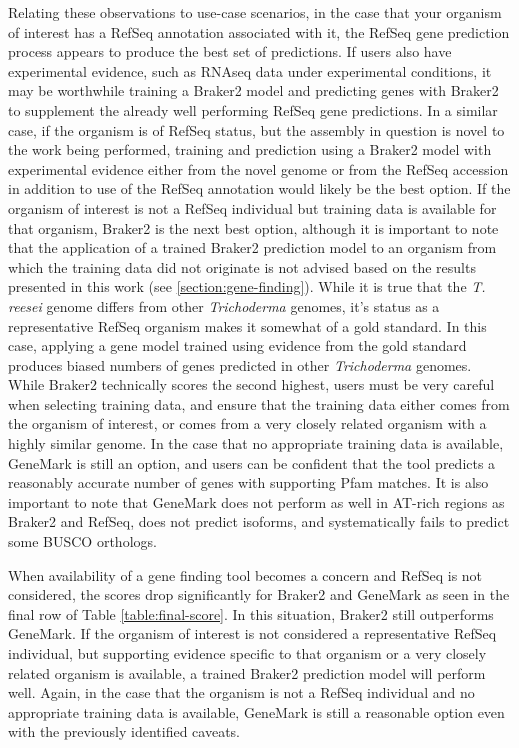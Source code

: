 Relating these observations to use-case scenarios, in the case that
your organism of interest has a RefSeq annotation associated with it,
the RefSeq gene prediction process appears to produce the best set of
predictions. If users also have experimental evidence, such as RNAseq
data under experimental conditions, it may be worthwhile training a
Braker2 model and predicting genes with Braker2 to supplement the
already well performing RefSeq gene predictions. In a similar case, if
the organism is of RefSeq status, but the assembly in question is
novel to the work being performed, training and prediction using a
Braker2 model with experimental evidence either from the novel genome
or from the RefSeq accession in addition to use of the RefSeq
annotation would likely be the best option. If the organism of
interest is not a RefSeq individual but training data is available for
that organism, Braker2 is the next best option, although it is
important to note that the application of a trained Braker2 prediction
model to an organism from which the training data did not originate is
not advised based on the results presented in this work (see
\ref{section:gene-finding}). While it is true that the
\textit{T. reesei} genome differs from other \textit{Trichoderma}
genomes, it's status as a representative RefSeq organism makes it
somewhat of a gold standard. In this case, applying a gene model
trained using evidence from the gold standard produces biased numbers
of genes predicted in other \textit{Trichoderma} genomes. While
Braker2 technically scores the second highest, users must be very
careful when selecting training data, and ensure that the training
data either comes from the organism of interest, or comes from a very
closely related organism with a highly similar genome. In the case
that no appropriate training data is available, GeneMark is still an
option, and users can be confident that the tool predicts a reasonably
accurate number of genes with supporting Pfam matches. It is also
important to note that GeneMark does not perform as well in AT-rich
regions as Braker2 and RefSeq, does not predict isoforms, and
systematically fails to predict some BUSCO orthologs.

When availability of a gene finding tool becomes a concern and RefSeq
is not considered, the scores drop significantly for Braker2 and
GeneMark as seen in the final row of Table \ref{table:final-score}. In
this situation, Braker2 still outperforms GeneMark. If the organism of
interest is not considered a representative RefSeq individual, but
supporting evidence specific to that organism or a very closely
related organism is available, a trained Braker2 prediction model will
perform well. Again, in the case that the organism is not a RefSeq
individual and no appropriate training data is available, GeneMark is
still a reasonable option even with the previously identified caveats.

